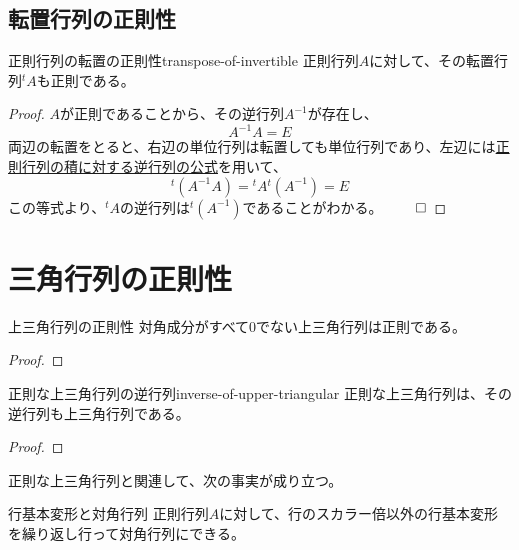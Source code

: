 \documentclass[../../../topic_linear-algebra]{subfiles}
\begin{document}
\subsection{転置行列の正則性}

\begin{theorem}{正則行列の転置の正則性}{transpose-of-invertible}
  正則行列$A$に対して、その転置行列${}^t A$も正則である。
\end{theorem}

\begin{proof}
  $A$が正則であることから、その逆行列$A^{-1}$が存在し、
  \begin{equation*}
    A^{-1}A = E
  \end{equation*}
  両辺の転置をとると、右辺の単位行列は転置しても単位行列であり、左辺には\hyperref[thm:inverse-of-product]{正則行列の積に対する逆行列の公式}を用いて、
  \begin{equation*}
    {}^t(A^{-1}A) = {}^t A {}^t (A^{-1}) = E
  \end{equation*}
  この等式より、${}^t A$の逆行列は${}^t (A^{-1})$であることがわかる。 $\qed$
\end{proof}

\sectionline
\section{三角行列の正則性}

\begin{theorem*}{上三角行列の正則性}
  対角成分がすべて0でない上三角行列は正則である。
\end{theorem*}

\begin{proof}
\end{proof}

\br

\begin{theorem}{正則な上三角行列の逆行列}{inverse-of-upper-triangular}
  正則な上三角行列は、その逆行列も上三角行列である。
\end{theorem}

\begin{proof}
  \todo{}
\end{proof}

\br

正則な上三角行列と関連して、次の事実が成り立つ。

\begin{theorem*}{行基本変形と対角行列}
  正則行列$A$に対して、行のスカラー倍以外の行基本変形を繰り返し行って対角行列にできる。
\end{theorem*}
\end{document}

